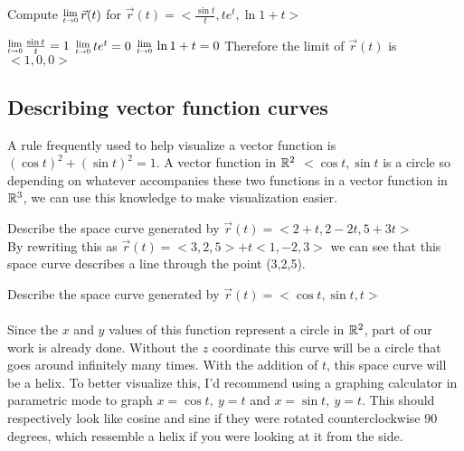 \documentclass[12 pt]{article}
\begin{document}
		\begin{exmp*}
			Compute $\Lim{t\rightarrow 0}\vec{r}(t)$ for $\vec{r}(t)=<\frac{\sin{t}}{t},te^t,\ln{1+t}>$

			$\Lim{t\rightarrow 0}\frac{\sin{t}}{t}=1$
			$\Lim{t\rightarrow 0}te^t=0$
			$\Lim{t\rightarrow 0}\ln{1+t}=0$
			Therefore the limit of $\vec{r}(t)$ is $<1,0,0>$
		\end{exmp*}

		\subsection{Describing vector function curves}

		A rule frequently used to help visualize a vector function is $(\cos{t})^2+(\sin{t})^2=1$. A vector function in $\mathbb{R}^2$ $<\cos{t},\sin{t}$ is a circle so depending on whatever accompanies these two functions in a vector function in $\mathbb{R}^3$, we can use this knowledge to make visualization easier.

		\begin{exmp*}
			Describe the space curve generated by $\vec{r}(t)=<2+t,2-2t,5+3t>$\\
			By rewriting this as $\vec{r}(t)=<3,2,5>+t<1,-2,3>$ we can see that this space curve describes a line through the point (3,2,5).
		\end{exmp*}

		\begin{exmp*}
			Describe the space curve generated by $\vec{r}(t)=<\cos{t},\sin{t},t>$\\\\
			Since the $x$ and $y$ values of this function represent a circle in $\mathbb{R}^2$, part of our work is already done. Without the $z$ coordinate this curve will be a circle that goes around infinitely many times. With the addition of $t$, this space curve will be a helix. To better visualize this, I'd recommend using a graphing calculator in parametric mode to graph $x=\cos{t},\ y=t$ and $x=\sin{t},\ y=t$. This should respectively look like cosine and sine if they were rotated counterclockwise 90 degrees, which ressemble a helix if you were looking at it from the side.
		\end{exmp*}
\end{document}
